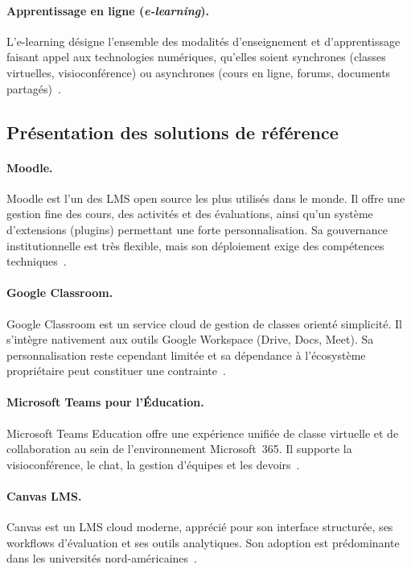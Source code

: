 ﻿\documentclass[12pt,a4paper,oneside]{report}
\begin{document}
\paragraph{Apprentissage en ligne (\textit{e-learning}).}
L'e-learning d\'esigne l'ensemble des modalit\'es d'enseignement et d'apprentissage faisant appel aux technologies num\'eriques, qu'elles soient synchrones (classes virtuelles, visioconf\'erence) ou asynchrones (cours en ligne, forums, documents partag\'es)~\cite{unesco_digital_2026}.

\subsection{Pr\'esentation des solutions de r\'ef\'erence}

\paragraph{Moodle.}
Moodle est l'un des LMS open source les plus utilis\'es dans le monde. Il offre une gestion fine des cours, des activit\'es et des \'evaluations, ainsi qu'un syst\`eme d'extensions (plugins) permettant une forte personnalisation. Sa gouvernance institutionnelle est tr\`es flexible, mais son d\'eploiement exige des comp\'etences techniques~\cite{moodle_overview_2026}.

\paragraph{Google Classroom.}
Google Classroom est un service cloud de gestion de classes orient\'e simplicit\'e. Il s'int\`egre nativement aux outils Google Workspace (Drive, Docs, Meet). Sa personnalisation reste cependant limit\'ee et sa d\'ependance \`a l'\'ecosyst\`eme propri\'etaire peut constituer une contrainte~\cite{google_classroom_2026}.

\paragraph{Microsoft Teams pour l'\'Education.}
Microsoft Teams Education offre une exp\'erience unifi\'ee de classe virtuelle et de collaboration au sein de l'environnement Microsoft~365. Il supporte la visioconf\'erence, le chat, la gestion d'\'equipes et les devoirs~\cite{microsoft_teams_edu_2026}.

\paragraph{Canvas LMS.}
Canvas est un LMS cloud moderne, appr\'eci\'e pour son interface structur\'ee, ses workflows d'\'evaluation et ses outils analytiques. Son adoption est pr\'edominante dans les universit\'es nord-am\'ericaines~\cite{canvas_overview_2026}.
\end{document}
